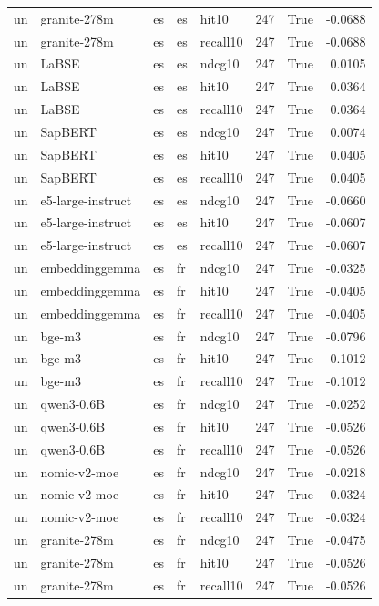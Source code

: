 \begin{tabular}{lllllrrr}
un & granite-278m & es & es & hit10 & 247 & True & -0.0688 \\
un & granite-278m & es & es & recall10 & 247 & True & -0.0688 \\
un & LaBSE & es & es & ndcg10 & 247 & True & 0.0105 \\
un & LaBSE & es & es & hit10 & 247 & True & 0.0364 \\
un & LaBSE & es & es & recall10 & 247 & True & 0.0364 \\
un & SapBERT & es & es & ndcg10 & 247 & True & 0.0074 \\
un & SapBERT & es & es & hit10 & 247 & True & 0.0405 \\
un & SapBERT & es & es & recall10 & 247 & True & 0.0405 \\
un & e5-large-instruct & es & es & ndcg10 & 247 & True & -0.0660 \\
un & e5-large-instruct & es & es & hit10 & 247 & True & -0.0607 \\
un & e5-large-instruct & es & es & recall10 & 247 & True & -0.0607 \\
un & embeddinggemma & es & fr & ndcg10 & 247 & True & -0.0325 \\
un & embeddinggemma & es & fr & hit10 & 247 & True & -0.0405 \\
un & embeddinggemma & es & fr & recall10 & 247 & True & -0.0405 \\
un & bge-m3 & es & fr & ndcg10 & 247 & True & -0.0796 \\
un & bge-m3 & es & fr & hit10 & 247 & True & -0.1012 \\
un & bge-m3 & es & fr & recall10 & 247 & True & -0.1012 \\
un & qwen3-0.6B & es & fr & ndcg10 & 247 & True & -0.0252 \\
un & qwen3-0.6B & es & fr & hit10 & 247 & True & -0.0526 \\
un & qwen3-0.6B & es & fr & recall10 & 247 & True & -0.0526 \\
un & nomic-v2-moe & es & fr & ndcg10 & 247 & True & -0.0218 \\
un & nomic-v2-moe & es & fr & hit10 & 247 & True & -0.0324 \\
un & nomic-v2-moe & es & fr & recall10 & 247 & True & -0.0324 \\
un & granite-278m & es & fr & ndcg10 & 247 & True & -0.0475 \\
un & granite-278m & es & fr & hit10 & 247 & True & -0.0526 \\
un & granite-278m & es & fr & recall10 & 247 & True & -0.0526 \\

\end{tabular}
